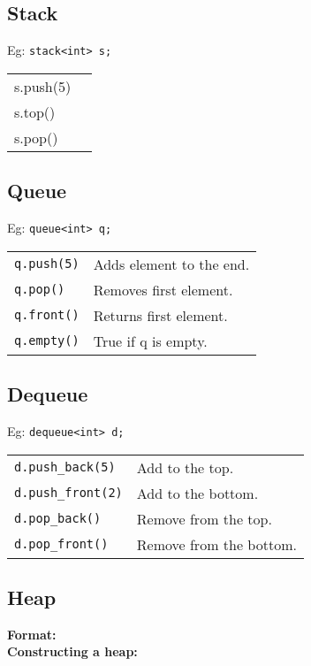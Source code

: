 \subsection{Stack}
Eg: \texttt{stack<int> s;}\\

\begin{tabularx}{\linewidth}{lX}
s.push(5) & \\
s.top() & \\
s.pop() & \\
\end{tabularx}

\subsection{Queue}
Eg: \texttt{queue<int> q;}\\

\begin{tabularx}{\linewidth}{lX}
\texttt{q.push(5)} & Adds element to the end.\\
\texttt{q.pop()} & Removes first element.\\
\texttt{q.front()} & Returns first element.\\
\texttt{q.empty()} & True if q is empty.\\
\end{tabularx}

\subsection{Dequeue}
Eg: \texttt{dequeue<int> d;}\\

\begin{tabularx}{\linewidth}{lX}
\texttt{d.push\_back(5)} & Add to the top.\\
\texttt{d.push\_front(2)} & Add to the bottom.\\
\texttt{d.pop\_back()} & Remove from the top.\\
\texttt{d.pop\_front()} & Remove from the bottom.\\
\end{tabularx}


\subsection{Heap}
\textbf{Format:}\\
\textbf{Constructing a heap:}\\

\vspace{-6pt}

